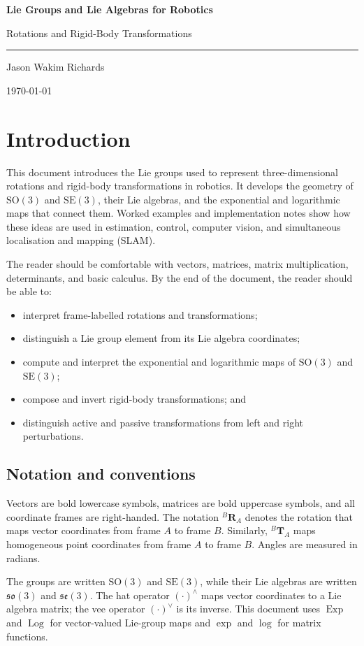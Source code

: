 \documentclass[10pt,a4paper]{article}
\numberwithin{equation}{section}
\newcommand{\TitleSize}{32}
\newcommand{\SubtitleSize}{16}
\newcommand{\TitleSpacing}{38}
\newcommand{\SubtitleSpacing}{20}
\newcommand{\DocumentTitle}{Lie Groups and Lie Algebras for Robotics}
\newcommand{\DocumentSubtitle}{Rotations and Rigid-Body Transformations}
\newcommand{\DocumentAuthor}{Jason Wakim Richards}
\newcommand{\DocumentDate}{\today}
\newcommand{\TitlePage}{
    \begin{titlepage}

        \vspace*{3cm}

        {\HeaderFamily
        \fontsize{\TitleSize}{\TitleSpacing}
        \selectfont
        \bfseries
        \DocumentTitle\par}

        \vspace{0.5cm}

        {\fontsize{\SubtitleSize}{\SubtitleSpacing}
        \selectfont
        \DocumentSubtitle\par}

        \vspace{1cm}

        \noindent
        \textcolor{LightGrey}{\rule{\textwidth}{1pt}}

        \vfill

        {\fontsize{12}{16}\selectfont
        \DocumentAuthor\par}

        \vspace{0.2cm}

        {\fontsize{10}{14}\selectfont
        \DocumentDate\par}

    \end{titlepage}
}
\newcommand{\Section}[1]{\section{#1}}
\newcommand{\Subsection}[1]{\subsection{#1}}
\newcommand{\SOthree}{\mathrm{SO}(3)}
\newcommand{\SEthree}{\mathrm{SE}(3)}
\newcommand{\sothree}{\mathfrak{so}(3)}
\newcommand{\sethree}{\mathfrak{se}(3)}
\newcommand{\Exp}{\operatorname{Exp}}
\newcommand{\Log}{\operatorname{Log}}
\theoremstyle{definition}
\theoremstyle{exercisestyle}
\begin{document}
\hypersetup{pageanchor=false}
\TitlePage
\hypersetup{pageanchor=true}

\tableofcontents

\newpage
{}

\Section{Introduction}

This document introduces the Lie groups used to represent three-dimensional
rotations and rigid-body transformations in robotics. It develops the geometry
of $\SOthree$ and $\SEthree$, their Lie algebras, and the exponential and
logarithmic maps that connect them. Worked examples and implementation notes
show how these ideas are used in estimation, control, computer vision, and
simultaneous localisation and mapping (SLAM).

The reader should be comfortable with vectors, matrices, matrix multiplication,
determinants, and basic calculus. By the end of the document, the reader should
be able to:

\begin{itemize}
    \item interpret frame-labelled rotations and transformations;
    \item distinguish a Lie group element from its Lie algebra coordinates;
    \item compute and interpret the exponential and logarithmic maps of
          $\SOthree$ and $\SEthree$;
    \item compose and invert rigid-body transformations; and
    \item distinguish active and passive transformations from left and right
          perturbations.
\end{itemize}

\Subsection{Notation and conventions}

Vectors are bold lowercase symbols, matrices are bold uppercase symbols, and
all coordinate frames are right-handed. The notation ${}^B\mathbf{R}_A$ denotes
the rotation that maps vector coordinates from frame $A$ to frame $B$.
Similarly, ${}^B\mathbf{T}_A$ maps homogeneous point coordinates from frame $A$
to frame $B$. Angles are measured in radians.

The groups are written $\SOthree$ and $\SEthree$, while their Lie algebras are
written $\sothree$ and $\sethree$. The hat operator $(\cdot)^\wedge$ maps vector
coordinates to a Lie algebra matrix; the vee operator $(\cdot)^\vee$ is its
inverse. This document uses $\Exp$ and $\Log$ for vector-valued Lie-group maps
and $\exp$ and $\log$ for matrix functions.
\end{document}
